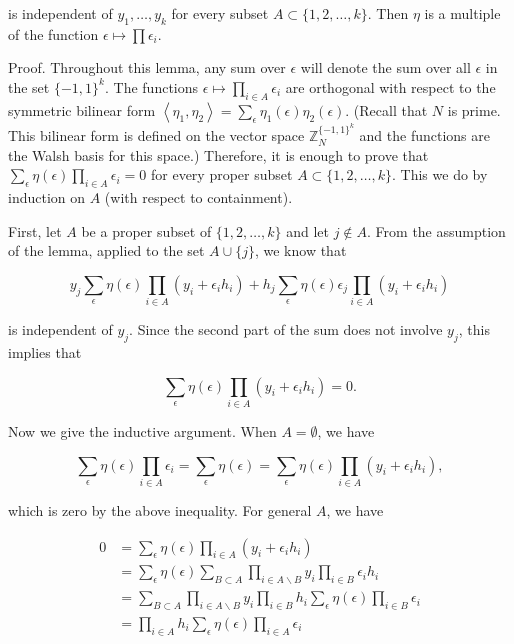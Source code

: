 \documentclass[10pt]{article}
\begin{document}
is independent of $y_{1}, \ldots, y_{k}$ for every subset $A \subset\{1,2, \ldots, k\}$. Then $\eta$ is a multiple of the function $\epsilon \mapsto \prod \epsilon_{i}$.

Proof. Throughout this lemma, any sum over $\epsilon$ will denote the sum over all $\epsilon$ in the set $\{-1,1\}^{k}$. The functions $\epsilon \mapsto \prod_{i \in A} \epsilon_{i}$ are orthogonal with respect to the symmetric bilinear form $\left\langle\eta_{1}, \eta_{2}\right\rangle=\sum_{\epsilon} \eta_{1}(\epsilon) \eta_{2}(\epsilon)$. (Recall that $N$ is prime. This bilinear form is defined on the vector space $\mathbb{Z}_{N}^{\{-1,1\}^{k}}$ and the functions are the Walsh basis for this space.) Therefore, it is enough to prove that $\sum_{\epsilon} \eta(\epsilon) \prod_{i \in A} \epsilon_{i}=0$ for every proper subset $A \subset\{1,2, \ldots, k\}$. This we do by induction on $A$ (with respect to containment).

First, let $A$ be a proper subset of $\{1,2, \ldots, k\}$ and let $j \notin A$. From the assumption of the lemma, applied to the set $A \cup\{j\}$, we know that

$$
y_{j} \sum_{\epsilon} \eta(\epsilon) \prod_{i \in A}\left(y_{i}+\epsilon_{i} h_{i}\right)+h_{j} \sum_{\epsilon} \eta(\epsilon) \epsilon_{j} \prod_{i \in A}\left(y_{i}+\epsilon_{i} h_{i}\right)
$$

is independent of $y_{j}$. Since the second part of the sum does not involve $y_{j}$, this implies that

$$
\sum_{\epsilon} \eta(\epsilon) \prod_{i \in A}\left(y_{i}+\epsilon_{i} h_{i}\right)=0 .
$$

Now we give the inductive argument. When $A=\emptyset$, we have

$$
\sum_{\epsilon} \eta(\epsilon) \prod_{i \in A} \epsilon_{i}=\sum_{\epsilon} \eta(\epsilon)=\sum_{\epsilon} \eta(\epsilon) \prod_{i \in A}\left(y_{i}+\epsilon_{i} h_{i}\right),
$$

which is zero by the above inequality. For general $A$, we have

$$
\begin{aligned}
0 & =\sum_{\epsilon} \eta(\epsilon) \prod_{i \in A}\left(y_{i}+\epsilon_{i} h_{i}\right) \\
& =\sum_{\epsilon} \eta(\epsilon) \sum_{B \subset A} \prod_{i \in A \backslash B} y_{i} \prod_{i \in B} \epsilon_{i} h_{i} \\
& =\sum_{B \subset A} \prod_{i \in A \backslash B} y_{i} \prod_{i \in B} h_{i} \sum_{\epsilon} \eta(\epsilon) \prod_{i \in B} \epsilon_{i} \\
& =\prod_{i \in A} h_{i} \sum_{\epsilon} \eta(\epsilon) \prod_{i \in A} \epsilon_{i}
\end{aligned}
$$
\end{document}

